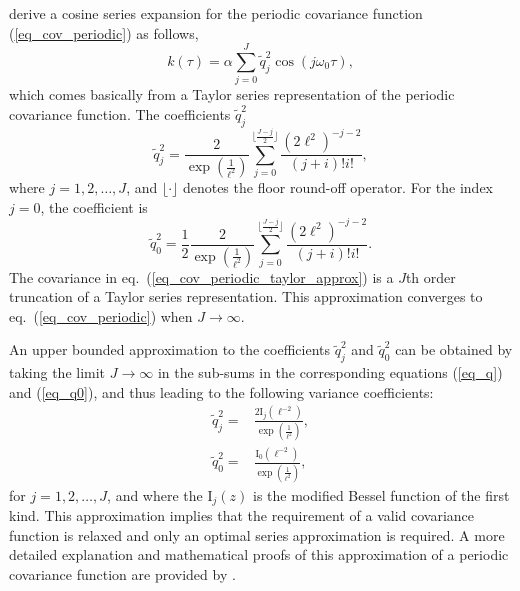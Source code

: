 \citet{solin2014explicit} derive a cosine series expansion for the periodic covariance function (\ref{eq_cov_periodic}) as follows,
% 
\begin{equation} \label{eq_cov_periodic_taylor_approx}
k(\tau)= \alpha \sum_{j=0}^{J} \tilde{q}_j^2 \cos(j\omega_0 \tau),
\end{equation}
which comes basically from a Taylor series representation of the periodic covariance function. The coefficients $\tilde{q}_j^2$ 
%
\begin{equation} \label{eq_q}
\tilde{q}_j^2= \frac{2}{\exp(\frac{1}{\ell^2})} \sum_{j=0}^{\lfloor \frac{J-j}{2} \rfloor} \frac{(2\ell^2)^{-j-2}}{(j+i)!i!},
\end{equation}
where $j=1,2,\ldots,J$, and $\lfloor \cdot \rfloor$ denotes the floor round-off operator. For the index $j=0$, the coefficient is 
%
\begin{equation} \label{eq_q0}
\tilde{q}_0^2= \frac{1}{2} \frac{2}{\exp(\frac{1}{\ell^2})} \sum_{j=0}^{\lfloor \frac{J-j}{2} \rfloor} \frac{(2\ell^2)^{-j-2}}{(j+i)!i!}.
\end{equation}
The covariance in eq.~(\ref{eq_cov_periodic_taylor_approx}) is a $J$th order truncation of a Taylor series representation. This approximation converges to eq.~(\ref{eq_cov_periodic}) when $J \rightarrow \infty$.

An upper bounded approximation to the coefficients $\tilde{q}_j^2$ and $\tilde{q}_0^2$ can be obtained by taking the limit $J \rightarrow \infty$ in the sub-sums in the corresponding equations (\ref{eq_q}) and (\ref{eq_q0}), and thus leading to the following variance coefficients:
%
\begin{equation}\label{eq_q_2}
\begin{split}
\tilde{q}_j^2=& \frac{2\mathrm{I}_j(\ell^{-2})}{\exp(\frac{1}{\ell^2})}, \\
\tilde{q}_0^2=& \frac{\mathrm{I}_0(\ell^{-2})}{\exp(\frac{1}{\ell^2})},
\end{split}
\end{equation} 
for $j=1,2,\ldots,J$, and where the $\mathrm{I}_{j}(z)$ is the modified Bessel function \citep{handbook1970m} of the first kind. This approximation implies that the requirement of a valid covariance function is relaxed and only an optimal series approximation is required. A more detailed explanation and mathematical proofs of this approximation of a periodic covariance function are provided by \citet{solin2014explicit}. 

